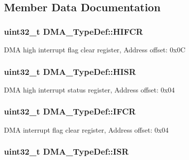 \subsection{Member Data Documentation}
\hypertarget{struct_d_m_a___type_def_a1e4f50b935bab2520788ae936f2e55c1}{
\subsubsection[{H\-I\-F\-C\-R}]{ uint32\-\_\-t D\-M\-A\-\_\-\-Type\-Def\-::\-H\-I\-F\-C\-R}}\label{struct_d_m_a___type_def_a1e4f50b935bab2520788ae936f2e55c1}
D\-M\-A high interrupt flag clear register, Address offset\-: 0x0\-C \hypertarget{struct_d_m_a___type_def_a01a90a5fcd6459e10b81c0ab737dd2e3}{
\subsubsection[{H\-I\-S\-R}]{ uint32\-\_\-t D\-M\-A\-\_\-\-Type\-Def\-::\-H\-I\-S\-R}}\label{struct_d_m_a___type_def_a01a90a5fcd6459e10b81c0ab737dd2e3}
D\-M\-A high interrupt status register, Address offset\-: 0x04 \hypertarget{struct_d_m_a___type_def_a30576220ca1968e61666d92092e8911e}{
\subsubsection[{I\-F\-C\-R}]{ uint32\-\_\-t D\-M\-A\-\_\-\-Type\-Def\-::\-I\-F\-C\-R}}\label{struct_d_m_a___type_def_a30576220ca1968e61666d92092e8911e}
D\-M\-A interrupt flag clear register, Address offset\-: 0x04 \hypertarget{struct_d_m_a___type_def_aa341a859df2f59bf6c0f7a000ab8734b}{
\subsubsection[{I\-S\-R}]{ uint32\-\_\-t D\-M\-A\-\_\-\-Type\-Def\-::\-I\-S\-R}}\label{struct_d_m_a___type_def_aa341a859df2f59bf6c0f7a000ab8734b}
